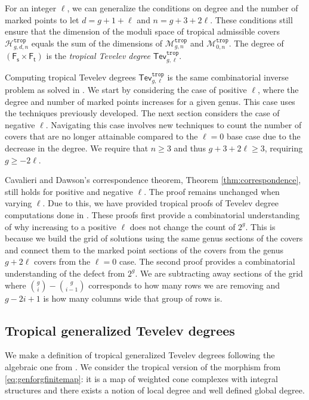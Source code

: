 \documentclass[11pt,reqno]{amsart}
\theoremstyle{definition}
\newcommand\trop{{\mathtt{trop}}}
\newcommand\Mgn[1]{\mathcal M_{#1}}
\newcommand\Hur[1]{\mathcal H_{#1}}
\newcommand{\Ft}{\mathsf{F_t}}
\newcommand{\Fs}{\mathsf{F_s}}
\newcommand{\Tev}{{\mathsf{Tev}}}
\begin{document}
For an integer $\ell$, we can generalize the conditions on degree and the number of marked points to let $d=g+1+\ell$ and $n=g+3+2\ell$. These conditions still ensure that the dimension of the moduli space of tropical admissible covers $\Hur{g,d,n}^{\trop}$ equals the sum of the dimensions of $\Mgn{g,n}^\trop$ and $\Mgn{0,n}^\trop$. The degree of $(\Fs\times\Ft)$ is the \textit{tropical Tevelev degree} $\Tev_{g,\ell}^\trop$.

Computing tropical Tevelev degrees $\Tev_{g,\ell}^\trop$ is the same combinatorial inverse problem as solved in \cite{troptev}. We start by considering the case of positive $\ell$, where the degree and number of marked points increases for a given genus. This case uses the techniques previously developed. The next section considers the case of negative $\ell$. Navigating this case involves new techniques to count the number of covers that are no longer attainable compared to the $\ell=0$ base case due to the decrease in the degree. We require that $n\geq 3$ and thus $g+3+2\ell\geq 3$, requiring $g \geq -2\ell$.  

Cavalieri and Dawson's correspondence theorem, Theorem \ref{thm:correspondence}, still holds for positive and negative $\ell$. The proof remains unchanged when varying $\ell$. Due to this, we have provided tropical proofs of Tevelev degree computations done in \cite{CPS:Tevdeg}. These proofs first provide a combinatorial understanding of why increasing to a positive $\ell$ does not change the count of $2^g$. This is because we build the grid of solutions using the same genus sections of the covers and connect them to the marked point sections of the covers from the genus $g+2\ell$ covers from the $\ell=0$ case. The second proof provides a combinatorial understanding of the defect from $2^g$. We are subtracting away sections of the grid where ${g\choose i}-{g \choose i-1}$ corresponds to how many rows we are removing and $g-2i+1$ is how many columns wide that group of rows is.

\subsection{Tropical generalized Tevelev degrees}

We make a definition of tropical generalized Tevelev degrees following the algebraic one from \cite{GenTev}. We consider the tropical version of the morphism from \ref{eq:genforgfinitemap}: it is a map of weighted cone complexes with integral structures and there exists a notion of local degree and well defined global degree.
\end{document}
